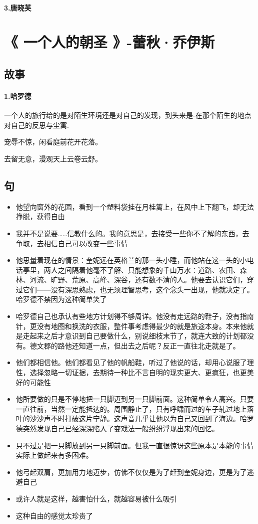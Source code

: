 \documentclass[UTF8,a4paper,8pt]{ctexbook}
\begin{document}
		\paragraph{3.唐晓芙}
		
		\newpage			
	\section{《 一个人的朝圣 》-蕾秋·乔伊斯 }
		\subsection{故事}  			
		\paragraph{1.哈罗德}一个人的旅行给的是对陌生环境还是对自己的发现，到头来是-在那个陌生的地点对自己的反思与尘寓.
		
			宠辱不惊，闲看庭前花开花落。
			
			去留无意，漫观天上云卷云舒。
			
		\subsection*{句}	
			\begin{itemize}
				\item 他望向窗外的花园，看到一个塑料袋挂在月桂篱上，在风中上下翻飞，却无法挣脱，获得自由
				\item 我并不是说要……信教什么的。我的意思是，去接受一些你不了解的东西，去争取，去相信自己可以改变一些事情
				\item 他思量着现在的情景：奎妮远在英格兰的那一头小睡，而他站在这一头的小电话亭里，两人之间隔着他毫不了解、只能想象的千山万水：道路、农田、森林、河流、旷野、荒原、高峰、深谷，还有数不清的人。他要去认识它们，穿过它们——没有深思熟虑，也无须理智思考，这个念头一出现，他就决定了。哈罗德不禁因为这种简单笑了
				\item 哈罗德自己也承认有些地方计划得不够周详。他没有走远路的鞋子，没有指南针，更没有地图和换洗的衣服，整件事考虑得最少的就是旅途本身。本来他就是走起来之后才意识到自己要做什么，别说细枝末节了，就连大致的计划都没有。德文郡的路他还知道一点，但出去之后呢？反正一直往北走就是了。
				\item 他们都相信他。他们都看见了他的帆船鞋，听过了他说的话，却用心说服了理性，选择忽略一切证据，去期待一种比不言自明的现实更大、更疯狂，也更美好的可能性
				\item 他所要做的只是不停地把一只脚迈到另一只脚前面。这种简单令人高兴。只要一直往前，当然一定能抵达的。周围静止了，只有呼啸而过的车子轧过地上落叶的沙沙声不时打破这片宁静。这声音几乎让他以为自己又回到了海边。哈罗德突然发现自己已经深深陷入了变戏法一般纷纷浮现出来的回忆。
				\item 只不过是把一只脚放到另一只脚前面。但我一直很惊讶这些原本是本能的事情实际上做起来有多困难。
				\item 他弓起双肩，更加用力地迈步，仿佛不仅仅是为了赶到奎妮身边，更是为了逃避自己
				\item 或许人就是这样，越害怕什么，就越容易被什么吸引
				\item 这种自由的感觉太珍贵了

			\end{itemize}
		
\end{document}
